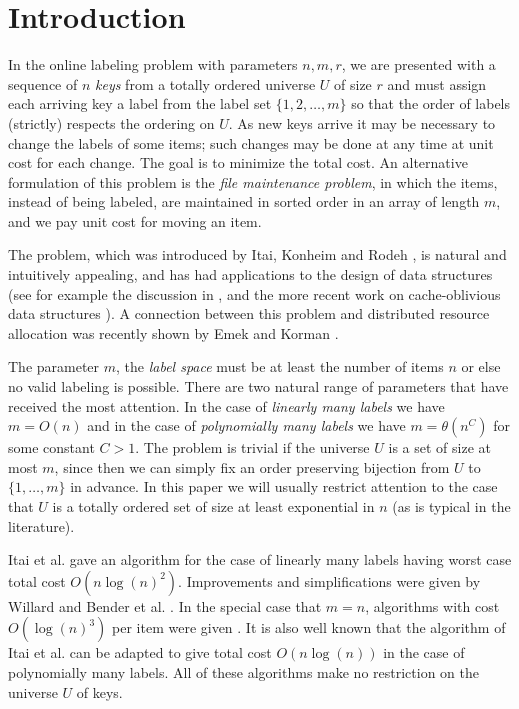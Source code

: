 \documentclass[runningheads,a4paper]{llncs}
\begin{document}
\section{Introduction}

In the online labeling problem with parameters $n,m,r$, 
we are presented with a sequence of $n$ {\em keys} from a totally ordered universe $U$ of size $r$
and must assign each arriving key a label from the label set $\{1,2,\dots,m\}$ so that the order of labels (strictly) respects the ordering on $U$.
As new keys arrive it may be necessary to change the labels of some items; such changes may be done at any time at unit cost
for each change.    
The goal is to minimize
the total cost.
An alternative formulation of this problem is
the \emph{file maintenance problem}, in which the items, instead of being labeled, 
are maintained in sorted order in an  array of length $m$, and we pay unit cost for moving an item. 

The problem, which was introduced by Itai, Konheim and Rodeh \cite{Itaietal}, 
is natural and intuitively appealing, and has had applications to the design of data structures (see for example
the discussion in \cite{DSZ04}, and the more recent work on cache-oblivious data structures 
\cite{BenderetalB-Tree,Brodaletal,BDIW}).  A connection between this problem and distributed resource allocation
was recently shown by Emek and Korman \cite{EK11}.


The parameter $m$, the {\em label space} must be at least the number of items $n$ or else no valid labeling is possible.  
There are two natural range of parameters that have received the most attention. In the case of {\em linearly many labels} we have
$m=O(n)$ and in the case of {\em polynomially many labels} we have $m=\theta(n^{C})$ for some constant $C>1$.  
The problem is trivial if the universe $U$ is a set of size at most $m$, since then we can simply fix an order preserving
bijection from $U$ to $\{1,\ldots,m\}$ in advance.  In this paper we will usually restrict attention to the case that  $U$
is a totally ordered set of size at least exponential in $n$ (as is typical in the literature).  

Itai et al. \cite{Itaietal} gave an algorithm for the case of linearly many labels having worst case total cost 
$O(n \log(n)^2)$.  Improvements and simplifications were given by Willard \cite{Willard} and Bender et al. \cite{Benderetal}. 
In the special case that $m=n$, algorithms with cost $O(\log(n)^3)$ per item were given
\cite{Zhang,BirdSadnicki}.  It is also
well known that the  algorithm of Itai et al. can be adapted to give total cost $O(n \log(n))$ in the case
of polynomially many labels.  
All of these algorithms make no restriction on the
universe $U$ of keys.
\end{document}
